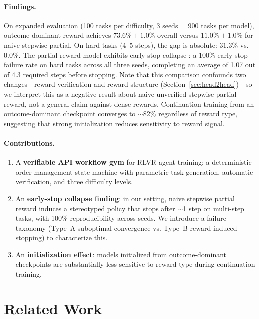 \documentclass[11pt]{article}
\begin{document}
\paragraph{Findings.}
On expanded evaluation (100 tasks per difficulty, 3 seeds = 900 tasks per model), outcome-dominant reward achieves $73.6\% \pm 1.0\%$ overall versus $11.0\% \pm 1.0\%$ for naive stepwise partial.
On hard tasks (4--5 steps), the gap is absolute: $31.3\%$ vs. $0.0\%$.
The partial-reward model exhibits early-stop collapse \citep{skalse2022misspecification}: a 100\% early-stop failure rate on hard tasks across all three seeds, completing an average of 1.07 out of 4.3 required steps before stopping.
Note that this comparison confounds two changes---reward verification and reward structure (Section~\ref{sec:head2head})---so we interpret this as a negative result about naive unverified stepwise partial reward, not a general claim against dense rewards.
Continuation training from an outcome-dominant checkpoint converges to $\sim$82\% regardless of reward type, suggesting that strong initialization reduces sensitivity to reward signal.

\paragraph{Contributions.}
\begin{enumerate}[leftmargin=*,itemsep=1pt]
  \item A \textbf{verifiable API workflow gym} for RLVR agent training: a deterministic order management state machine with parametric task generation, automatic verification, and three difficulty levels.
  \item An \textbf{early-stop collapse finding}: in our setting, naive stepwise partial reward induces a stereotyped policy that stops after $\sim$1 step on multi-step tasks, with 100\% reproducibility across seeds. We introduce a failure taxonomy (Type~A suboptimal convergence vs. Type~B reward-induced stopping) to characterize this.
  \item An \textbf{initialization effect}: models initialized from outcome-dominant checkpoints are substantially less sensitive to reward type during continuation training.
\end{enumerate}

\section{Related Work}
\label{sec:related}
\end{document}
